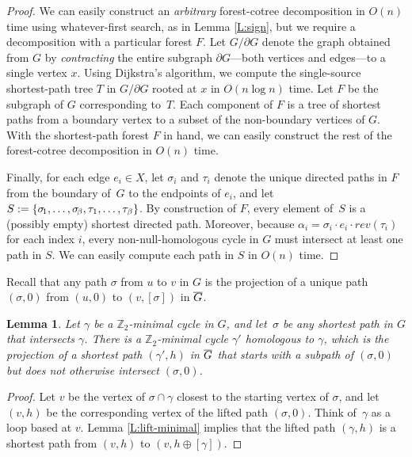 \documentclass[twoside,leqno,twocolumn]{article}
\def\rev{\mathit{rev}}
\def\Z{\mathbb{Z}}
\let\cycle\gamma
\let\primalarc\alpha
\def\Gbar{\overline{\smash{G}\vphantom{t}}}
\newtheorem{lemma}[theorem]{Lemma}
\begin{document}
{\begin{proof}
We can easily construct an \emph{arbitrary} forest-cotree decomposition in $O(n)$ time using whatever-first search, as in Lemma \ref{L:sign}, but we require a decomposition with a particular forest $F$.  Let $G/\partial G$ denote the graph obtained from $G$ by \emph{contracting} the entire subgraph $\partial G$---both vertices and edges---to a single vertex $x$.  Using Dijkstra's algorithm, we compute the single-source shortest-path tree $T$ in $G/\partial G$ rooted at $x$ in $O(n\log n)$ time.  Let $F$ be the subgraph of $G$ corresponding to~$T$.  Each component of $F$ is a tree of shortest paths from a boundary vertex to a subset of the non-boundary vertices of $G$.  With the shortest-path forest $F$ in hand, we can easily construct the rest of the forest-cotree decomposition in $O(n)$ time.

Finally, for each edge $e_i\in X$, let $\sigma_i$ and $\tau_i$ denote the unique directed paths in $F$ from the boundary of~$G$ to the endpoints of $e_i$, and let $S := \{ \sigma\!_1, \dots, \sigma\!_\beta, \allowbreak \tau_1, \dots, \tau_\beta \}$.  By construction of $F$, every element of~$S$ is a (possibly empty) shortest directed path.  Moreover, because $\primalarc_i = \sigma_i \cdot e_i \cdot \rev(\tau_i)$ for each index $i$, every non-null-homologous cycle in $G$ must intersect at least one path in $S$.  We can easily compute each path in $S$ in $O(n)$ time.
\end{proof}

Recall that any path $\sigma$ from $u$ to $v$ in $G$ is the projection of a unique path $(\sigma,0)$ from $(u,0)$ to $(v,[\sigma])$ in $\Gbar$.

\begin{lemma}
\label{L:nocross}
Let $\cycle$ be a $\Z_2$-minimal cycle in $G$, and let~$\sigma$ be any shortest path in $G$ that intersects $\cycle$.  There is a $\Z_2$-minimal cycle $\cycle'$ homologous to $\cycle$, which is the projection of a shortest path $(\cycle', h)$ in $\Gbar$ that starts with a subpath of $(\sigma, 0)$ but does not otherwise intersect $(\sigma, 0)$.
\end{lemma}

\begin{proof}
Let $v$ be the vertex of $\sigma\cap\cycle$ closest to the starting vertex of $\sigma$, and let $(v,h)$ be the corresponding vertex of the lifted path $(\sigma,0)$.  Think of~$\cycle$ as a loop based at $v$.  Lemma \ref{L:lift-minimal} implies that the lifted path $(\cycle, h)$ is a shortest path from $(v,h)$ to $(v,h\oplus [\cycle])$.


\end{proof}}
\end{document}
